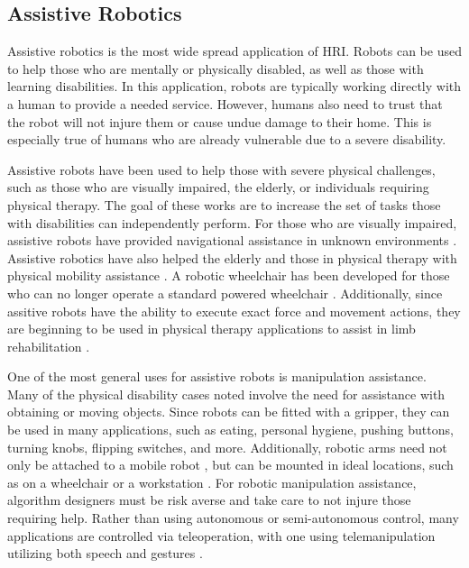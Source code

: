 \documentclass{article}
\begin{document}
\subsection{Assistive Robotics}
Assistive robotics is the most wide spread application of HRI. Robots can be used to help those who are mentally or physically disabled, as well as those with learning disabilities. In this application, robots are typically working directly with a human to provide a needed service. However, humans also need to trust that the robot will not injure them or cause undue damage to their home. This is especially true of humans who are already vulnerable due to a severe disability. 

Assistive robots have been used to help those with severe physical challenges, such as those who are visually impaired, the elderly, or individuals requiring physical therapy. The goal of these works are to increase the set of tasks those with disabilities can independently perform. For those who are visually impaired, assistive robots have provided navigational assistance in unknown environments \cite{Kulyukin:2006:RWV:1145471.1145473, journals/ras/LaceyD98}. Assistive robotics have also helped the elderly and those in physical therapy with physical mobility assistance \cite{Lum, Montemerlo:2002:EMR:777092.777183, 6346821, Wheel}. A robotic wheelchair has been developed for those who can no longer operate a standard powered wheelchair \cite{Wheel}. Additionally, since assitive robots have the ability to execute exact force and movement actions, they are beginning to be used in physical therapy applications to assist in limb rehabilitation \cite{Lum, 6346821}.

One of the most general uses for assistive robots is manipulation assistance. Many of the physical disability cases noted involve the need for assistance with obtaining or moving objects. Since robots can be fitted with a gripper, they can be used in many applications, such as eating, personal hygiene, pushing buttons, turning knobs, flipping switches, and more. Additionally, robotic arms need not only be attached to a mobile robot \cite{372896}, but can be mounted in ideal locations, such as on a wheelchair \cite{1639157, Hillman:2002:WWM:978899.978901, Kwee:1998:ICM:981017.981020} or a workstation \cite{372890, 475482}. For robotic manipulation assistance, algorithm designers must be risk averse and take care to not injure those requiring help. Rather than using autonomous or semi-autonomous control, many applications are controlled via teleoperation, with one using telemanipulation utilizing both speech and gestures \cite{Zunaid}.
\end{document}
